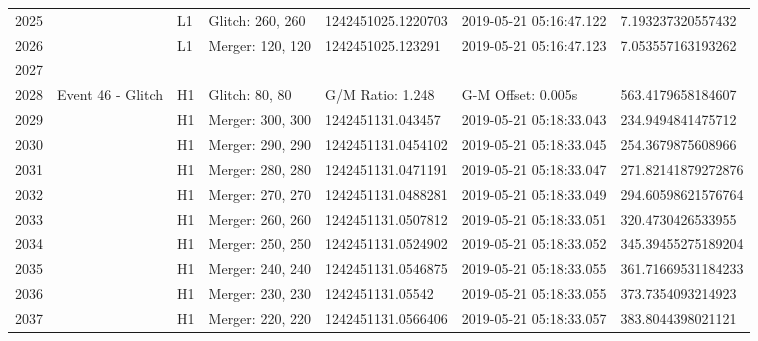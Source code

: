 \begin{longtable}{lllllll}
2025 &                                                    &       L1 &  Glitch: 260, 260 &  1242451025.1220703 &  2019-05-21 05:16:47.122 &   7.193237320557432 \\
2026 &                                                    &       L1 &  Merger: 120, 120 &   1242451025.123291 &  2019-05-21 05:16:47.123 &   7.053557163193262 \\
2027 &                                                    &          &                   &                     &                          &                     \\
2028 &                                  Event 46 - Glitch &       H1 &    Glitch: 80, 80 &    G/M Ratio: 1.248 &       G-M Offset: 0.005s &   563.4179658184607 \\
2029 &                                                    &       H1 &  Merger: 300, 300 &   1242451131.043457 &  2019-05-21 05:18:33.043 &   234.9494841475712 \\
2030 &                                                    &       H1 &  Merger: 290, 290 &  1242451131.0454102 &  2019-05-21 05:18:33.045 &   254.3679875608966 \\
2031 &                                                    &       H1 &  Merger: 280, 280 &  1242451131.0471191 &  2019-05-21 05:18:33.047 &  271.82141879272876 \\
2032 &                                                    &       H1 &  Merger: 270, 270 &  1242451131.0488281 &  2019-05-21 05:18:33.049 &  294.60598621576764 \\
2033 &                                                    &       H1 &  Merger: 260, 260 &  1242451131.0507812 &  2019-05-21 05:18:33.051 &   320.4730426533955 \\
2034 &                                                    &       H1 &  Merger: 250, 250 &  1242451131.0524902 &  2019-05-21 05:18:33.052 &  345.39455275189204 \\
2035 &                                                    &       H1 &  Merger: 240, 240 &  1242451131.0546875 &  2019-05-21 05:18:33.055 &  361.71669531184233 \\
2036 &                                                    &       H1 &  Merger: 230, 230 &    1242451131.05542 &  2019-05-21 05:18:33.055 &   373.7354093214923 \\
2037 &                                                    &       H1 &  Merger: 220, 220 &  1242451131.0566406 &  2019-05-21 05:18:33.057 &   383.8044398021121 \\

\end{longtable}
